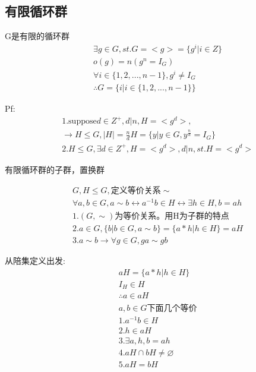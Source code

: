 \documentclass[12pt, a4paper]{article}  %
\begin{document}
\subsection{有限循环群}
G是有限的循环群
\begin{align}
    &\exists g\in G,st. G=<g>=\{g^i|i\in Z\}\\
    &o(g)=n (g^n=I_G)\\
    &\forall i\in \{1,2,...,n-1\},g^i \neq I_G\\
    &\therefore G=\{i|i\in \{1,2,...,n-1\}\}
\end{align}

Pf:
\begin{align}
    &1.\text{suppose} d\in Z^{+},d|n,H=<g^d>,\\
    &\rightarrow H\leqslant G,|H|=\frac{n}{d}H=\{y|y\in G,y^{\frac{n}{d}}=I_G\}\\
    &2.H\leqslant G,\exists d\in Z^{+},H=<g^d>,d|n,st. H=<g^{d}>
\end{align}

有限循环群的子群，置换群

\begin{align}
    &G,H\leqslant G,\text{定义等价关系}\sim\\
    &\forall a,b\in G,a\sim b \leftrightarrow a^{-1}b\in H\leftrightarrow \exists h\in H,b=ah\\
    &1.(G,\sim)\text{为等价关系。用H为子群的特点}\\
    &2.a\in G,\{b|b\in G,a\sim b\}=\{a*h|h\in H\}=aH\\
    &3.a\sim b\rightarrow \forall g\in G,ga\sim gb
\end{align}

从陪集定义出发:
\begin{align}
    &aH=\{a*h|h\in H\}\\
    &I_H\in H\\
    &\therefore a\in aH\\
    &a,b\in G\text{下面几个等价}\\
    &1.a^{-1}b\in H\\
    &2.h\in aH\\
    &3.\exists a,h,b=ah\\
    &4.aH\cap bH\neq \varnothing\\
    &5.aH=bH
\end{align}
\end{document}
